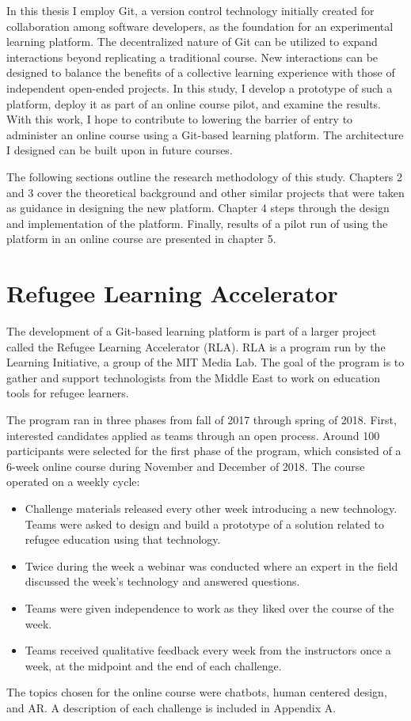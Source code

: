 \documentclass[12pt,twoside,vi]{mitthesis}
\newcommand{\draft}[1]{{\color{blue} #1}}
\begin{document}
In this thesis I employ Git, a version control technology initially created for collaboration among software developers, as the foundation for an experimental learning platform. The decentralized nature of Git can be utilized to expand interactions beyond replicating a traditional course. New interactions can be designed to balance the benefits of a collective learning experience with those of independent open-ended projects. In this study, I develop a prototype of such a platform, deploy it as part of an online course pilot, and examine the results. With this work, I hope to contribute to lowering the barrier of entry to administer an online course using a Git-based learning platform. The architecture I designed can be built upon in future courses. 

The following sections outline the research methodology of this study. Chapters 2 and 3 cover the theoretical background and other similar projects that were taken as guidance in designing the new platform. Chapter 4 steps through the design and implementation of the platform. Finally, results of a pilot run of using the platform in an online course are presented in chapter 5. 

\section{Refugee Learning Accelerator}

The development of a Git-based learning platform is part of a larger project called the Refugee Learning Accelerator (RLA). RLA is a program run by the Learning Initiative, a group of the MIT Media Lab. The goal of the program is to gather and support technologists from the Middle East to work on education tools for refugee learners. 

\draft{The program ran in three phases from fall of 2017 through spring of 2018. First, interested candidates applied as teams through an open process. Around 100 participants were selected for the first phase of the program, which consisted of a 6-week online course during November and December of 2018. The course operated on a weekly cycle:
\begin{itemize}
\item Challenge materials released every other week introducing a new technology. Teams were asked to design and build a prototype of a solution related to refugee education using that technology.
\item Twice during the week a webinar was conducted where an expert in the field discussed the week's technology and answered questions.
\item Teams were given independence to work as they liked over the course of the week.
\item Teams received qualitative feedback every week from the instructors once a week, at the midpoint and the end of each challenge.
\end{itemize}
The topics chosen for the online course were chatbots, human centered design, and AR. A description of each challenge is included in Appendix A.}
\end{document}
